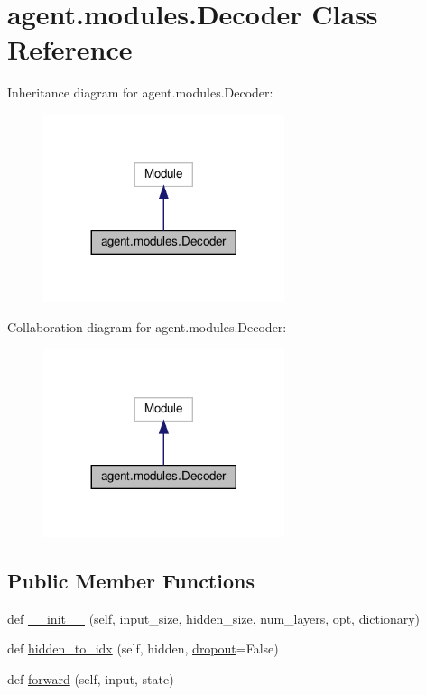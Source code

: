 \hypertarget{classagent_1_1modules_1_1Decoder}{}\section{agent.\+modules.\+Decoder Class Reference}
\label{classagent_1_1modules_1_1Decoder}


Inheritance diagram for agent.\+modules.\+Decoder\+:
\nopagebreak
\begin{figure}[H]
\begin{center}
\leavevmode
\includegraphics[width=200pt]{classagent_1_1modules_1_1Decoder__inherit__graph}
\end{center}
\end{figure}


Collaboration diagram for agent.\+modules.\+Decoder\+:
\nopagebreak
\begin{figure}[H]
\begin{center}
\leavevmode
\includegraphics[width=200pt]{classagent_1_1modules_1_1Decoder__coll__graph}
\end{center}
\end{figure}
\subsection*{Public Member Functions}
\begin{DoxyCompactItemize}
\item 
def \hyperlink{classagent_1_1modules_1_1Decoder_ac77f95c38737d146d1f92c45d2de59dc}{\+\_\+\+\_\+init\+\_\+\+\_\+} (self, input\+\_\+size, hidden\+\_\+size, num\+\_\+layers, opt, dictionary)
\item 
def \hyperlink{classagent_1_1modules_1_1Decoder_ad0179be7c6224482204f3ce575894573}{hidden\+\_\+to\+\_\+idx} (self, hidden, \hyperlink{classagent_1_1modules_1_1Decoder_a9924bcfb8e8bd2c76f9d359d55df8c6b}{dropout}=False)
\item 
def \hyperlink{classagent_1_1modules_1_1Decoder_a4c609d3b51a4ef925c943c22a7a015e8}{forward} (self, input, state)
\end{DoxyCompactItemize}

